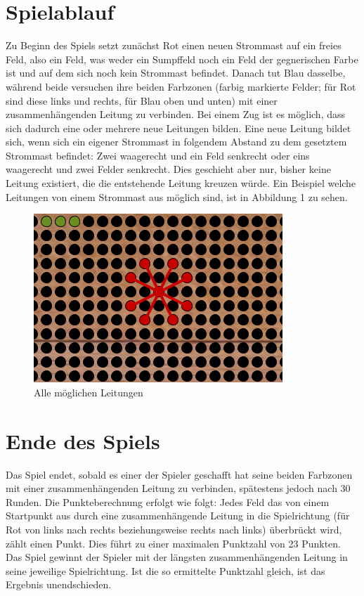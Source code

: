 \documentclass[a4paper, ngerman]{scrartcl}
\begin{document}
\section{Spielablauf}	 
Zu Beginn des Spiels setzt zunächst Rot einen neuen Strommast auf ein
freies Feld, also ein Feld, was weder ein Sumpffeld noch ein Feld der gegnerischen Farbe ist
und auf dem sich noch kein Strommast befindet. Danach tut Blau dasselbe, während beide versuchen
ihre beiden Farbzonen (farbig markierte Felder; für Rot sind diese links und
rechts, für Blau  oben und unten) mit einer zusammenhängenden Leitung zu
verbinden.
	Bei einem Zug ist es möglich, dass sich dadurch eine oder mehrere
	neue Leitungen bilden. Eine neue Leitung bildet sich, wenn sich ein eigener
	Strommast in folgendem Abstand zu dem gesetztem Strommast befindet: Zwei
	waagerecht und ein Feld senkrecht oder eins waagerecht und zwei Felder
	senkrecht. Dies geschieht aber nur, bisher keine Leitung existiert, die die
	entstehende Leitung kreuzen würde.
	Ein Beispiel welche Leitungen von einem Strommast aus möglich sind, ist
	in Abbildung 1 zu sehen.
	 
	
	
	
	\begin{figure}[h!]
		\centering
		\includegraphics[scale = 0.8]{bilder/setzzug.png}
		\caption{Alle möglichen Leitungen}
		\label{fig:Leitungen}
	\end{figure}
	
\section{Ende des Spiels} 
	Das Spiel endet, sobald es einer der Spieler geschafft hat seine beiden
	Farbzonen mit einer zusammenhängenden Leitung zu verbinden, spätestens jedoch
	nach 30 Runden.
	Die Punkteberechnung erfolgt wie folgt: Jedes Feld das von einem Startpunkt aus
	durch eine zusammenhängende Leitung in die Spielrichtung (für Rot von links
	nach rechts beziehungsweise rechts nach links) überbrückt wird, zählt einen Punkt. Dies
	führt zu einer maximalen Punktzahl von 23 Punkten. Das Spiel gewinnt der
	Spieler mit der längsten zusammenhängenden Leitung in seine jeweilige
	Spielrichtung.
	Ist die so ermittelte Punktzahl gleich, ist das Ergebnis unendschieden.
	
\end{document}
